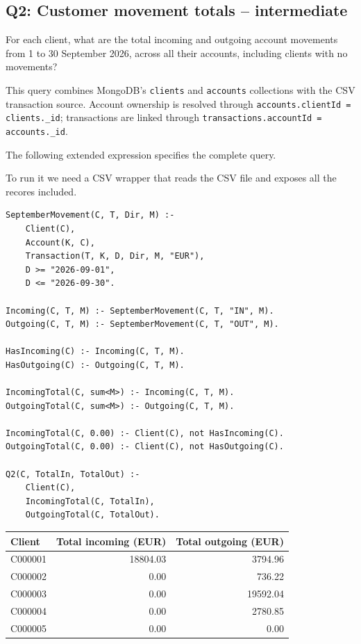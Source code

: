 \documentclass[11pt,a4paper]{article}
\begin{document}
\subsection{Q2: Customer movement totals -- intermediate}

For each client, what are the total incoming and outgoing account movements
from 1 to 30 September 2026, across all their accounts, including clients
with no movements?

This query combines MongoDB's \texttt{clients} and \texttt{accounts}
collections with the CSV transaction source. Account ownership is resolved
through \texttt{accounts.clientId = clients.\_id}; transactions are linked
through \texttt{transactions.accountId = accounts.\_id}.

The following extended expression specifies the complete query.

To run it we need a CSV wrapper that reads the CSV file and exposes all
the recores included.

\begin{lstlisting}
SeptemberMovement(C, T, Dir, M) :-
    Client(C),
    Account(K, C),
    Transaction(T, K, D, Dir, M, "EUR"),
    D >= "2026-09-01",
    D <= "2026-09-30".

Incoming(C, T, M) :- SeptemberMovement(C, T, "IN", M).
Outgoing(C, T, M) :- SeptemberMovement(C, T, "OUT", M).

HasIncoming(C) :- Incoming(C, T, M).
HasOutgoing(C) :- Outgoing(C, T, M).

IncomingTotal(C, sum<M>) :- Incoming(C, T, M).
OutgoingTotal(C, sum<M>) :- Outgoing(C, T, M).

IncomingTotal(C, 0.00) :- Client(C), not HasIncoming(C).
OutgoingTotal(C, 0.00) :- Client(C), not HasOutgoing(C).

Q2(C, TotalIn, TotalOut) :-
    Client(C),
    IncomingTotal(C, TotalIn),
    OutgoingTotal(C, TotalOut).
\end{lstlisting}


\begingroup
\renewcommand{\arraystretch}{1.2}
\begin{tabularx}{\textwidth}{@{}l r r@{}}
\toprule
Client & Total incoming (EUR) & Total outgoing (EUR)\\
\midrule
C000001 & 18804.03 & 3794.96\\
C000002 & 0.00 & 736.22\\
C000003 & 0.00 & 19592.04\\
C000004 & 0.00 & 2780.85\\
C000005 & 0.00 & 0.00\\
\bottomrule
\end{tabularx}
\endgroup
\end{document}
